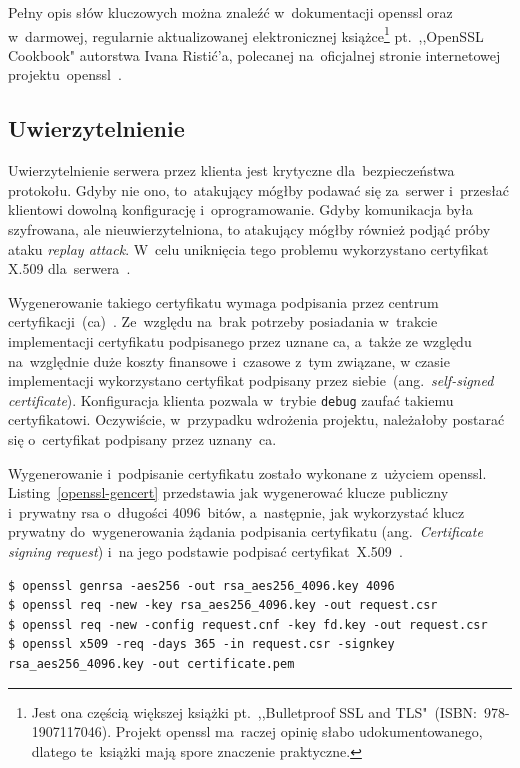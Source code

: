 \documentclass[thesis]{subfiles}
\begin{document}
Pełny opis słów kluczowych można znaleźć w~dokumentacji \gls{openssl} oraz w~darmowej, regularnie aktualizowanej elektronicznej książce\footnote{Jest ona częścią większej książki pt.~,,Bulletproof SSL and TLS"~(ISBN:~978-1907117046). Projekt \gls{openssl} ma~raczej opinię słabo udokumentowanego, dlatego te~książki mają spore znaczenie praktyczne.} pt.~,,OpenSSL Cookbook" autorstwa Ivana Ristić'a, polecanej na~oficjalnej stronie internetowej projektu~\gls{openssl}~\cite{openssl-cookbook-suites}.


\subsection{Uwierzytelnienie}

Uwierzytelnienie serwera przez klienta jest krytyczne dla~bezpieczeństwa protokołu. Gdyby nie ono, to~atakujący mógłby podawać się za~serwer i~przesłać klientowi dowolną konfigurację i~oprogramowanie. Gdyby komunikacja była szyfrowana, ale nieuwierzytelniona, to atakujący mógłby również podjąć próby ataku \emph{replay attack}. W~celu uniknięcia tego problemu wykorzystano certyfikat X.509 dla~serwera~\cite{wiki:x509}.

Wygenerowanie takiego certyfikatu wymaga podpisania przez centrum certyfikacji~(\gls{ca})~\cite{wiki:ca}. Ze~względu na~brak potrzeby posiadania w~trakcie implementacji certyfikatu podpisanego przez uznane \gls{ca}, a~także ze względu na~względnie duże koszty finansowe i~czasowe z~tym związane, w czasie implementacji wykorzystano certyfikat podpisany przez siebie~(ang.~\emph{self-signed certificate}). Konfiguracja klienta pozwala w~trybie \texttt{debug} zaufać takiemu certyfikatowi. Oczywiście, w~przypadku wdrożenia projektu, należałoby postarać się o~certyfikat podpisany przez uznany~\gls{ca}.

Wygenerowanie i~podpisanie certyfikatu zostało wykonane z~użyciem \gls{openssl}. Listing~\ref{openssl-gencert} przedstawia jak wygenerować klucze publiczny i~prywatny \gls{rsa} o~długości 4096~bitów, a~następnie, jak wykorzystać klucz prywatny do~wygenerowania żądania podpisania certyfikatu (ang.~\emph{Certificate signing request}) i~na jego podstawie podpisać certyfikat~X.509~\cite{openssl-cookbook,wiki:csr}.

\begin{lstlisting}[numbers=none,caption={Wygenerowanie i~podpisanie certyfikatu X.509},label=openssl-gencert]
$ openssl genrsa -aes256 -out rsa_aes256_4096.key 4096
$ openssl req -new -key rsa_aes256_4096.key -out request.csr
$ openssl req -new -config request.cnf -key fd.key -out request.csr
$ openssl x509 -req -days 365 -in request.csr -signkey rsa_aes256_4096.key -out certificate.pem
\end{lstlisting}
\end{document}
